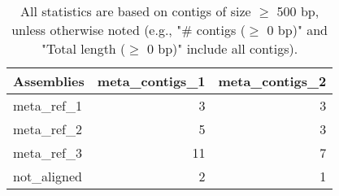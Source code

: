 \documentclass[12pt,a4paper]{article}
\begin{document}
\begin{table}[ht]
\begin{center}
\caption{All statistics are based on contigs of size $\geq$ 500 bp, unless otherwise noted (e.g., "\# contigs ($\geq$ 0 bp)" and "Total length ($\geq$ 0 bp)" include all contigs).}
\begin{tabular}{|l*{2}{|r}|}
\hline
Assemblies & meta\_contigs\_1 & meta\_contigs\_2 \\ \hline
meta\_ref\_1 & 3 & 3 \\ \hline
meta\_ref\_2 & 5 & 3 \\ \hline
meta\_ref\_3 & 11 & 7 \\ \hline
not\_aligned & 2 & 1 \\ \hline
\end{tabular}
\end{center}
\end{table}
\end{document}
